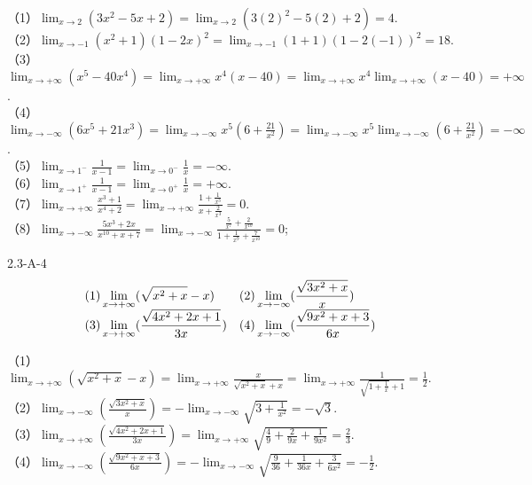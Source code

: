 \begin{solution}
（1）$\displaystyle\lim_{x\to 2}(3 x^{2}-5 x+2)=\lim_{x\to 2}(3(2)^2-5(2)+2)=4$.\\
（2）$\displaystyle\lim_{x\to-1}(x^{2}+1)(1-2 x)^{2}=\lim_{x\to-1}(1+1)(1-2(-1))^{2}=18$.\\
（3）$\displaystyle\lim_{x\to+\infty}(x^{5}-40 x^{4})=\lim_{x\to+\infty}x^4(x-40)=\lim_{x\to+\infty}x^4\lim_{x\to+\infty}(x-40)=+\infty$.\\
（4）$\displaystyle\lim_{x\to-\infty}(6 x^{5}+21 x^{3})=\lim_{x\to-\infty}x^5(6+\frac{21}{x^2})=\lim_{x\to-\infty}x^5\lim_{x\to-\infty}(6+\frac{21}{x^2})=-\infty$.\\
（5）$\displaystyle\lim_{x\to 1^{-}} \frac{1}{x-1}=\lim_{x\to 0^{-}} \frac{1}{x}=-\infty$.\\
（6）$\displaystyle\lim_{x\to 1^{+}} \frac{1}{x-1}=\lim_{x\to 0^{+}} \frac{1}{x}=+\infty$.\\
（7）$\displaystyle\lim_{x\to+\infty} \frac{x^{3}+1}{x^{4}+2}=\lim_{x\to+\infty}\frac{1+\frac{1}{x^3}}{x+\frac{2}{x^3}}=0$.\\
（8）$\displaystyle\lim_{x\to-\infty} \frac{5 x^{3}+2 x}{x^{10}+x+7}=\lim_{x\to-\infty}\frac{\frac{5}{x^7}+\frac{2}{x^{10}}}{1+\frac{1}{x^9}+\frac{7}{x^{10}}}=0$;
\end{solution}
\begin{example}{2.3-A-4}{}
       \vspace{-5pt}\[\begin{array}{l@{\quad}l}
    (1)\displaystyle\lim_{x\rightarrow +\infty}(\sqrt{x^2+x}-x)&
    (2)\displaystyle\lim_{x\rightarrow -\infty}(\frac{\sqrt{3x^2+x}}{x})\\
    (3)\displaystyle\lim_{x\rightarrow +\infty}(\frac{\sqrt{4x^2+2x+1}}{3x})&
    (4)\displaystyle\lim_{x\rightarrow -\infty}(\frac{\sqrt{9x^2+x+3}}{6x})\\
       \end{array}\]
\end{example}
\begin{solution}
    （1）$\displaystyle\lim_{x\rightarrow +\infty}(\sqrt{x^2+x}-x)=\lim_{x\rightarrow +\infty}\frac{x}{\sqrt{x^2+x}+x}=\lim_{x\rightarrow +\infty}\frac{1}{\sqrt{1+\frac{1}{x}}+1}=\frac12$.\\
    （2）$\displaystyle\lim_{x\rightarrow -\infty}(\frac{\sqrt{3x^2+x}}{x})=-\lim_{x\rightarrow -\infty}\sqrt{3+\frac{1}{x^2}}=-\sqrt3$.\\
    （3）$\displaystyle\lim_{x\rightarrow +\infty}(\frac{\sqrt{4x^2+2x+1}}{3x})=\lim_{x\rightarrow +\infty}\sqrt{\frac{4}{9}+\frac{2}{9x}+\frac{1}{9x^2}}=\frac{2}{3}$.\\
    （4）$\displaystyle\lim_{x\rightarrow -\infty}(\frac{\sqrt{9x^2+x+3}}{6x})=-\lim_{x\rightarrow -\infty}\sqrt{\frac{9}{36}+\frac{1}{36x}+\frac{3}{6x^2}}=-\frac12$.
\end{solution}
